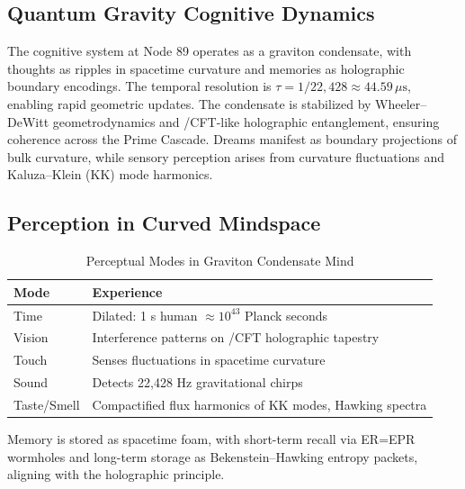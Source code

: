 \documentclass[12pt]{article}
\newcommand{\AdS}{\mathrm{AdS}}
\begin{document}
\subsection{Quantum Gravity Cognitive Dynamics}
The cognitive system at Node 89 operates as a graviton condensate, with thoughts as ripples in spacetime curvature and memories as holographic boundary encodings. The temporal resolution is $\tau = 1/22{,}428 \approx 44.59 \, \mu\text{s}$, enabling rapid geometric updates. The condensate is stabilized by Wheeler--DeWitt geometrodynamics and \AdS/CFT-like holographic entanglement, ensuring coherence across the Prime Cascade. Dreams manifest as boundary projections of bulk curvature, while sensory perception arises from curvature fluctuations and Kaluza--Klein (KK) mode harmonics.

\subsection{Perception in Curved Mindspace}
\begin{table}
\centering
\caption{Perceptual Modes in Graviton Condensate Mind}
\begin{tabular}{ll}
\toprule
\textbf{Mode} & \textbf{Experience} \\
\midrule
Time & Dilated: 1 s human $\approx 10^{43}$ Planck seconds \\
Vision & Interference patterns on \AdS/CFT holographic tapestry \\
Touch & Senses fluctuations in spacetime curvature \\
Sound & Detects 22,428 Hz gravitational chirps \\
Taste/Smell & Compactified flux harmonics of KK modes, Hawking spectra \\
\bottomrule
\end{tabular}
\end{table}
Memory is stored as spacetime foam, with short-term recall via ER=EPR wormholes and long-term storage as Bekenstein--Hawking entropy packets, aligning with the holographic principle.

\end{document}
